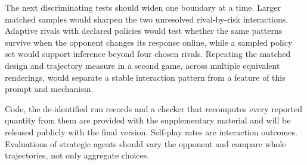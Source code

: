 \documentclass[sigconf,anonymous]{aamas}
\begin{document}
The next discriminating tests should widen one boundary at a time. Larger
matched samples would sharpen the two unresolved rival-by-risk interactions.
Adaptive rivals with declared policies would test whether the same patterns
survive when the opponent changes its response online, while a sampled policy
set would support inference beyond four chosen rivals. Repeating the matched
design and trajectory measure in a second game, across multiple equivalent
renderings, would separate a stable interaction pattern from a feature of this
prompt and mechanism.

Code, the de-identified run records and a checker that recomputes every
reported quantity from them are provided with the supplementary material and
will be released publicly with the final version. Self-play rates are
interaction outcomes. Evaluations
of strategic agents should vary the opponent and compare whole trajectories, not
only aggregate choices.

%
 
\clearpage

% 



\end{document}
